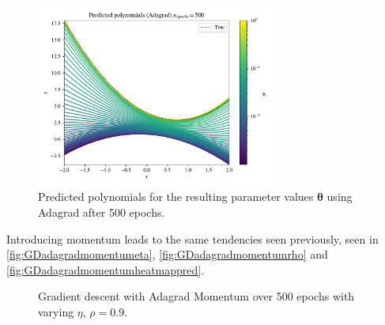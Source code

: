 \documentclass{article}
\theoremstyle{definition}
\begin{document}
\begin{figure}[H]%
    \centering
    \includegraphics[width=8cm]{Project2/figures/polynomial_grad/OLS_autodiff/adagrad_prediction.pdf}
    \caption{Predicted polynomials for the resulting parameter values $\boldsymbol{\theta}$ using Adagrad after 500 epochs.}
    \label{fig:GDadagradpred}
\end{figure}

Introducing momentum leads to the same tendencies seen previously, seen in \autoref{fig:GDadagradmomentumeta}, \autoref{fig:GDadagradmomentumrho} and \autoref{fig:GDadagradmomentumheatmappred}.

\begin{figure}[H]%
    \centering
    \qquad
    \caption{Gradient descent with Adagrad Momentum over 500 epochs with varying $\eta$, $\rho=0.9$.}%
    \label{fig:GDadagradmomentumeta}%
\end{figure}
\end{document}
